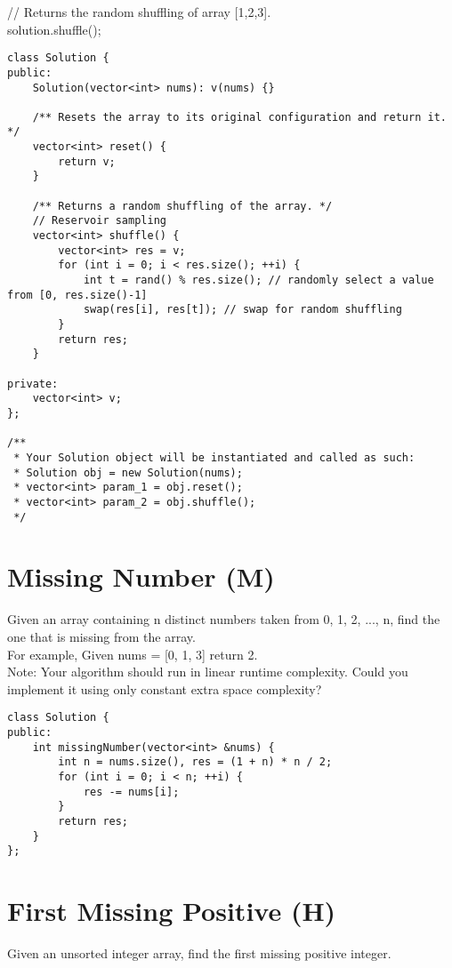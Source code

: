 // Returns the random shuffling of array [1,2,3].\\
solution.shuffle();\\

\begin{lstlisting}
class Solution {
public:
    Solution(vector<int> nums): v(nums) {}
    
    /** Resets the array to its original configuration and return it. */
    vector<int> reset() {
        return v;
    }
    
    /** Returns a random shuffling of the array. */
    // Reservoir sampling
    vector<int> shuffle() {
        vector<int> res = v;
        for (int i = 0; i < res.size(); ++i) {
            int t = rand() % res.size(); // randomly select a value from [0, res.size()-1]
            swap(res[i], res[t]); // swap for random shuffling
        }
        return res;
    }
    
private:
    vector<int> v;
};

/**
 * Your Solution object will be instantiated and called as such:
 * Solution obj = new Solution(nums);
 * vector<int> param_1 = obj.reset();
 * vector<int> param_2 = obj.shuffle();
 */
\end{lstlisting}


\section{Missing Number (M)}
Given an array containing n distinct numbers taken from 0, 1, 2, ..., n, find the one that is missing from the array.\\

For example, 
Given nums = [0, 1, 3] return 2.\\

Note:
Your algorithm should run in linear runtime complexity. Could you implement it using only constant extra space complexity? \\

\begin{lstlisting}
class Solution {
public:
    int missingNumber(vector<int> &nums) {
        int n = nums.size(), res = (1 + n) * n / 2;
        for (int i = 0; i < n; ++i) {
            res -= nums[i];
        }
        return res;
    }
};
\end{lstlisting}


\section{First Missing Positive (H)}
Given an unsorted integer array, find the first missing positive integer.\\

